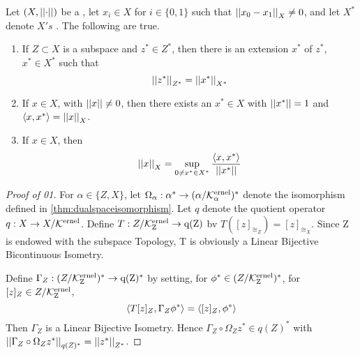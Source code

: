 \label{thm:hahnbanach}
\begin{thm}
Let $(X,\left|\left| \cdot \right|\right|)$ be a \SeminormedSpace,
let $x_i \in X$ for $i \in \{0,1\}$ such that 
$\left|\left| x_0-x_1 \right|\right|_X \neq 0$, and
let $X^*$ denote $X's$
\TopDualSpace. 
The following are true. 
\begin{enumerate}
    \item If $Z \subset X$ is a subspace
        and $z^* \in Z^*$, then there 
        is an extension $x^*$ of $z^*$, 
        $x^* \in X^*$ such that 
        \begin{equation}
        \left|\left| z^* \right|\right|_{Z^*} = \left|\left| x^* \right|\right|_{X^*}
        \end{equation}
     \item If $x \in X$, 
        with $\left|\left| x \right|\right| \neq 0$, 
        then there exists an
        $x^* \in X$ with 
        $\left|\left| x^* \right|\right|=1$ and 
        $\left\langle x,x^* \right\rangle = \left|\left| x \right|\right|_X$. 
    \item If $x \in X$, then 
    \begin{equation}
        \left|\left| x \right|\right|_X = \sup\limits_{0 \neq x^* \in X^*} \frac{\left\langle x,x^* \right\rangle}{\left|\left| x^* \right|\right|}
    \end{equation}
\end{enumerate}


\begin{proof}[Proof of 01]
    For $\alpha \in \{Z,X\}$, let 
    $\Omega_\alpha:\alpha^* \to (\alpha/\bf\mathcal{K}\rm^{ernel}_\alpha)^*$ denote the isomorphism
    defined in 
    \ref{thm:dualspaceisomorphism}.
    Let $q$ denote the quotient operator $q:X \to X/\bf\mathcal{K}\rm^{ernel}$. 
    Define $T:Z/\bf\mathcal{K}\rm^{ernel}_Z \to q(Z)$ bv $T([z]_{\cong_Z} ) = [z]_{\cong_X}$. %
    Since Z is endowed with the subspace Topology,                       %
    T is obviously a Linear Bijective Bicontinuous Isometry.          %
    
    Define $\Gamma_Z:(Z/\bf\mathcal{K}\rm^{ernel}_Z)^* \to q(Z)^*$ by setting, 
    for $\phi^* \in (Z/\bf\mathcal{K}\rm^{ernel}_Z)^*$, 
    for $[z]_Z \in Z/\bf\mathcal{K}\rm^{ernel}_Z$, 
    \begin{equation}
        \left\langle T[z]_Z, \Gamma_Z \phi^* \right\rangle = \left\langle [z]_Z, \phi^* \right\rangle
    \end{equation}
    Then $\Gamma_Z$ is a Linear Bijective Isometry. 
    Hence $\Gamma_Z \circ \Omega_Z z^* \in q(Z)^*$ with 
    $\left|\left| \Gamma_Z \circ \Omega_Z z^* \right|\right|_{q(Z)^*} = \left|\left| z^* \right|\right|_{Z^*}$. 


\end{proof}
\end{thm}
